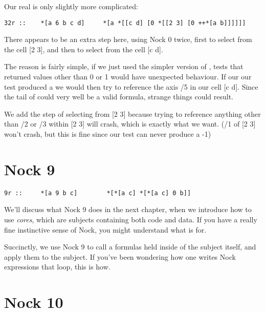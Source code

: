 Our real  is only slightly more complicated:

\begin{framed_shaded}
\begin{Verbatim}[fontsize=\relsize{-2.5},fontseries=b,commandchars=\\\{\}]
32r ::    *[a 6 b c d]     *[a *[[c d] [0 *[[2 3] [0 ++*[a b]]]]]]
\end{Verbatim}
\end{framed_shaded}
There appears to be an extra step here, using Nock 0 twice, first to select from the cell [2 3], and then to select from the cell [c d]. 

The reason is fairly simple, if we just used the simpler version of , tests that returned values other than 0 or 1 would have unexpected behaviour. If our our test produced a  we would then try to reference the axis /5 in our cell [c d]. Since the tail of  could very well be a valid formula, strange things could result.

We add the step of selecting from [2 3] because trying to reference anything other than /2 or /3 within [2 3] will crash, which is exactly what we want. (/1 of [2 3] won't crash, but this is fine since our test can never produce a -1)

\section{Nock 9}

\begin{framed_shaded}
\begin{Verbatim}[fontsize=\relsize{-2.5},fontseries=b,commandchars=\\\{\}]
9r ::     *[a 9 b c]        *[*[a c] *[*[a c] 0 b]] 
\end{Verbatim}
\end{framed_shaded}
We'll discuss what Nock 9 does in the next chapter, when we introduce how to
use \emph{cores}, which are subjects containing both code and data.  If you have a
really fine instinctive sense of Nock, you might understand what  is for.

Succinctly, we use Nock 9 to call a formulas held inside of the subject itself,
and apply them to the subject. If you've been wondering how one writes Nock
expressions that loop, this is how.

\section{Nock 10}


